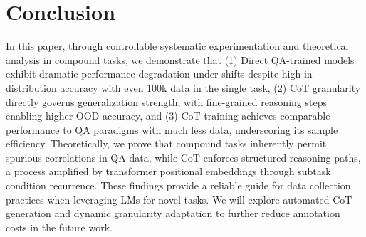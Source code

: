 \vspace{-0.2em}
\section{Conclusion}
In this paper, through controllable systematic experimentation and theoretical analysis in compound tasks, we demonstrate that (1) Direct QA-trained models exhibit dramatic performance degradation under shifts despite high in-distribution accuracy with even 100k data in the single task, (2) CoT granularity directly governs generalization strength, with fine-grained reasoning steps enabling higher OOD accuracy, and (3) CoT training achieves comparable performance to QA paradigms with much less data, underscoring its sample efficiency. Theoretically, we prove that compound tasks inherently permit spurious correlations in QA data, while CoT enforces structured reasoning paths, a process amplified by transformer positional embeddings through subtask condition recurrence. These findings provide a reliable guide for data
collection practices when leveraging LMs for novel tasks. We will explore automated CoT generation and dynamic granularity adaptation to further reduce annotation costs in the future work. 